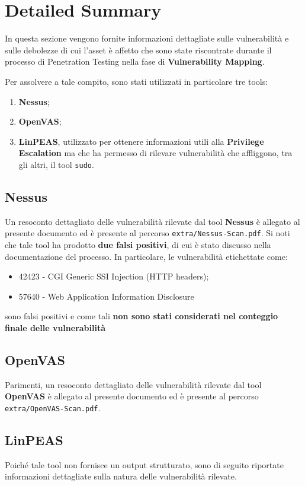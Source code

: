 \documentclass[a4paper, 12pt, oneside]{article}
\begin{document}
\section{Detailed Summary}
In questa sezione vengono fornite informazioni dettagliate sulle vulnerabilità e sulle debolezze di cui l'asset è affetto che sono state riscontrate durante il processo di Penetration Testing nella fase di \textbf{Vulnerability Mapping}.

Per assolvere a tale compito, sono stati utilizzati in particolare tre tools:

\begin{enumerate}
    \item \textbf{Nessus};
    \item \textbf{OpenVAS};
    \item \textbf{LinPEAS}, utilizzato per ottenere informazioni utili alla \textbf{Privilege Escalation} ma che ha permesso di rilevare vulnerabilità che affliggono, tra gli altri, il tool \texttt{sudo}.
\end{enumerate}

\subsection{Nessus}
Un resoconto dettagliato delle vulnerabilità rilevate dal tool \textbf{Nessus} è allegato al presente documento ed è presente al percorso \texttt{extra/Nessus-Scan.pdf}. Si noti che tale tool ha prodotto \textbf{due falsi positivi}, di cui è stato discusso nella documentazione del processo. In particolare, le vulnerabilità etichettate come:

\begin{itemize}
    \item 42423 - CGI Generic SSI Injection (HTTP headers);
    \item 57640 - Web Application Information Disclosure 
\end{itemize}

sono falsi positivi e come tali \textbf{non sono stati considerati nel conteggio finale delle vulnerabilità}

\subsection{OpenVAS}
Parimenti, un resoconto dettagliato delle vulnerabilità rilevate dal tool \textbf{OpenVAS} è allegato al presente documento ed è presente al percorso \texttt{extra/OpenVAS-Scan.pdf}.

\subsection{LinPEAS}
Poiché tale tool non fornisce un output strutturato, sono di seguito riportate informazioni dettagliate sulla natura delle vulnerabilità rilevate.
\end{document}
